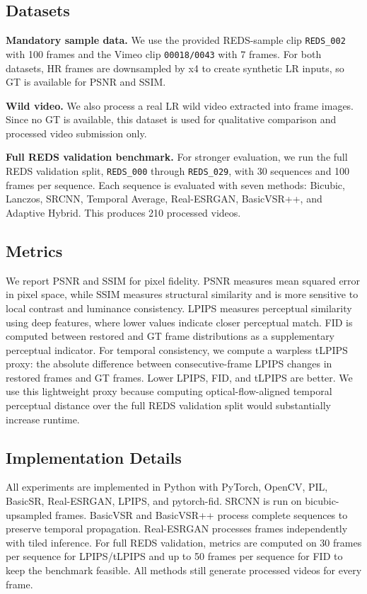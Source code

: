 \documentclass[10pt,twocolumn,letterpaper]{article}
\begin{document}
\subsection{Datasets}
\textbf{Mandatory sample data.}
We use the provided REDS-sample clip \texttt{REDS\_002} with 100 frames and the Vimeo clip \texttt{00018/0043} with 7 frames. For both datasets, HR frames are downsampled by x4 to create synthetic LR inputs, so GT is available for PSNR and SSIM.

\textbf{Wild video.}
We also process a real LR wild video extracted into frame images. Since no GT is available, this dataset is used for qualitative comparison and processed video submission only.

\textbf{Full REDS validation benchmark.}
For stronger evaluation, we run the full REDS validation split, \texttt{REDS\_000} through \texttt{REDS\_029}, with 30 sequences and 100 frames per sequence. Each sequence is evaluated with seven methods: Bicubic, Lanczos, SRCNN, Temporal Average, Real-ESRGAN, BasicVSR++, and Adaptive Hybrid. This produces 210 processed videos.

\subsection{Metrics}
We report PSNR and SSIM for pixel fidelity. PSNR measures mean squared error in pixel space, while SSIM measures structural similarity and is more sensitive to local contrast and luminance consistency. LPIPS measures perceptual similarity using deep features, where lower values indicate closer perceptual match. FID is computed between restored and GT frame distributions as a supplementary perceptual indicator. For temporal consistency, we compute a warpless tLPIPS proxy: the absolute difference between consecutive-frame LPIPS changes in restored frames and GT frames. Lower LPIPS, FID, and tLPIPS are better. We use this lightweight proxy because computing optical-flow-aligned temporal perceptual distance over the full REDS validation split would substantially increase runtime.

\subsection{Implementation Details}
All experiments are implemented in Python with PyTorch, OpenCV, PIL, BasicSR, Real-ESRGAN, LPIPS, and pytorch-fid. SRCNN is run on bicubic-upsampled frames. BasicVSR and BasicVSR++ process complete sequences to preserve temporal propagation. Real-ESRGAN processes frames independently with tiled inference. For full REDS validation, metrics are computed on 30 frames per sequence for LPIPS/tLPIPS and up to 50 frames per sequence for FID to keep the benchmark feasible. All methods still generate processed videos for every frame.
\end{document}
